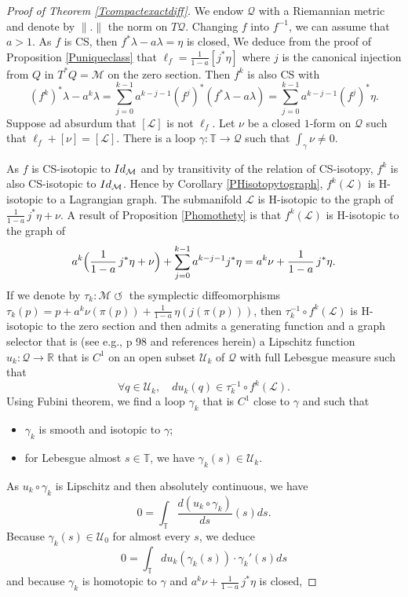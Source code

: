 \documentclass[11pt]{article}
\newcommand{\eg}{e.g.,\xspace}
\numberwithin{equation}{section}
\numberwithin{figure}{section}
\numberwithin{table}{section}
\providecommand{\righttoleftarrow}{\mathrel{\circlearrowleft}}
\theoremstyle{definition}
\def\R{\mathbb{R}}
\def\T{\mathbb{T}}
\def\cL{{\mathcal L}}
\def\cM{{\mathcal M}}
\def\cQ{{\mathcal Q}}
\def\cU{{\mathcal U}}
\begin{document}
\begin{proof}[Proof of Theorem \ref{Tcompactexactdiff}]
We endow $\cQ$ with a Riemannian metric and denote by $\|.\|$ the norm on $T\cQ$. Changing $f$ into $f^{-1}$, we can assume that $a>1$. As $f$ is CS, then $f^*\lambda-a\lambda=\eta$ is closed, We deduce from the proof of Proposition \ref{Puniqueclass} that $\ell_f=\frac{1}{1-a}[j^*\eta]$ where $j$ is the canonical injection from $Q$ in $T^*Q=\cM$ on the zero section.
Then $f^k$ is also CS with
\[
(f^k)^*\lambda-a^k\lambda=\sum_{j=0}^{k-1}a^{k-j-1}(f^j)^*(f^*\lambda-a\lambda)=\sum_{j=0}^{k-1}a^{k-j-1}(f^j)^*\eta.
\]
Suppose ad absurdum that $[\cL]$ is not $\ell_f$. Let $\nu$ be a closed $1$-form on $\cQ$ such that $\ell_f+[\nu]=[\cL]$. There is a loop $\gamma:\T\to\cQ$ such that $\int_\gamma \nu\not=0$.

As $f$ is CS-isotopic to ${\rm Id}_\cM$ and by transitivity of the relation of CS-isotopy, $f^k$ is also CS-isotopic to ${\rm Id}_\cM$. Hence by Corollary \ref{PHisotopytograph}, $f^k(\cL)$ is H-isotopic to a Lagrangian graph. The submanifold $\cL$ is H-isotopic to the graph of
$\frac{1}{1-a}\,j^*\eta+\nu$. A result of Proposition \ref{Phomothety} is that $f^k(\cL)$ is H-isotopic to the graph of
\[
a^k\Bigl( \frac{1}{1-a}\,j^*\eta+\nu\Bigr)+\sum_{j=0}^{k-1}a^{k-j-1}j^*\eta=a^k\nu+\frac{1}{1-a}\,j^*\eta.
\]
If we denote by $\tau_k:\cM\righttoleftarrow$ the symplectic diffeomorphisms $\tau_k(p)=p+ a^k\nu(\pi(p))+\frac{1}{1-a}\,\eta(j(\pi(p)))$, then $\tau_{k}^{-1}\circ f^k(\cL)$ is H-isotopic to the zero section and then admits a generating function and a graph selector that is (see \eg \cite{Sib2004} p 98 and references herein) a Lipschitz function $u_k:\cQ\to \R$ that is $C^1$ on an open subset $\cU_k$ of $\cQ$ with full Lebesgue measure such that
\[
\forall q\in\cU_k,\quad du_k(q)\in \tau_{k}^{-1}\circ f^k(\cL).
\]
Using Fubini theorem, we find a loop $\gamma_k$ that is $C^1$ close to $\gamma$ and such that
\begin{itemize}
\item $\gamma_k$ is smooth and isotopic to $\gamma$;
\item for Lebesgue almost $s\in\T$, we have $\gamma_k(s)\in\cU_k$.
\end{itemize}
As $u_k\circ \gamma_k $ is Lipschitz and then absolutely continuous, we have
\[
0=\int_\T \frac{d(u_k\circ \gamma_k)}{ds}(s)ds.
\]
Because $\gamma_k(s)\in\cU_0$ for almost every $s$, we deduce
\[
0=\int_\T du_k(\gamma_k(s))\cdot \gamma_k'(s)ds
\]
and because $\gamma_k$ is homotopic to $\gamma$ and $a^k\nu+\frac{1}{1-a}\,j^*\eta$ is closed,

\end{proof}
\end{document}
